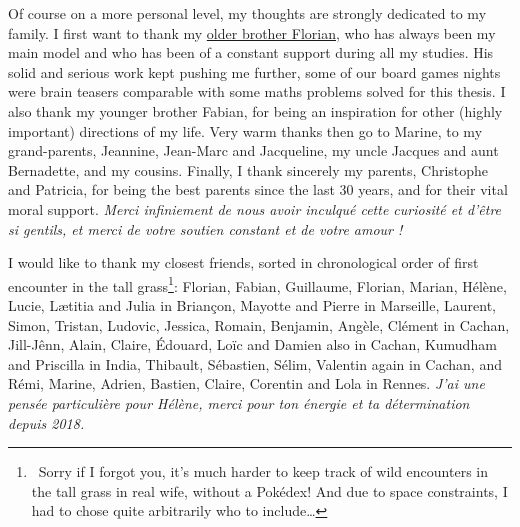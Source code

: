 \begin{acknowledgements}
Of course on a more personal level, my thoughts are strongly dedicated to my family.
%
I first want to thank my \href{https://paris-sorbonne.academia.edu/FBesson}{older brother Florian}, who has always been my main model and who has been of a constant support during all my studies. His solid and serious work kept pushing me further, some of our board games nights were brain teasers comparable with some maths problems solved for this thesis.
%
I also thank my younger brother Fabian, for being an inspiration for other (highly important) directions of my life.
Very warm thanks then go to Marine, to my grand-parents, Jeannine, Jean-Marc and Jacqueline, my uncle Jacques and aunt Bernadette, and my cousins.
Finally, I thank sincerely my parents, Christophe and Patricia, for being the best parents since the last 30 years, and for their vital moral support.
\emph{Merci infiniement de nous avoir inculqué cette curiosité et d'être si gentils, et merci de votre soutien constant et de votre amour !}

I would like to thank my closest friends, sorted in chronological order of first encounter in the tall grass\footnote{~Sorry if I forgot you, it's much harder to keep track of wild encounters in the tall grass in real wife, without a Pokédex! And due to space constraints, I had to chose quite arbitrarily who to include\dots}: Florian, Fabian, Guillaume, Florian, Marian, Hélène, Lucie, Lætitia and Julia in Briançon, Mayotte and Pierre in Marseille, Laurent, Simon, Tristan, Ludovic, Jessica, Romain, Benjamin, Angèle, Clément in Cachan, Jill-Jênn, Alain, Claire, Édouard, Loïc and Damien also in Cachan, Kumudham and Priscilla in India, Thibault, Sébastien, Sélim, Valentin again in Cachan, and Rémi, Marine, Adrien, Bastien, Claire, Corentin and Lola in Rennes.
\emph{J'ai une pensée particulière pour Hélène, merci pour ton énergie et ta détermination depuis 2018.}


\end{acknowledgements}
